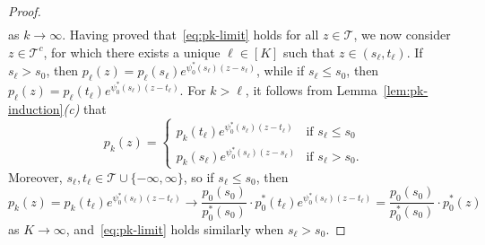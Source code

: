 \documentclass[a4paper]{article}
\theoremstyle{definition}
\begin{document}
\begin{proof}
\begin{align*}
\end{align*}
as $k \to \infty$. Having proved that~\eqref{eq:pk-limit} holds for all $z \in \mathcal{T}$, we now consider $z \in \mathcal{T}^c$, for which there exists a unique $\ell \in [K]$ such that $z \in (s_\ell,t_\ell)$. If $s_\ell > s_0$, then $p_\ell(z) = p_\ell(s_\ell)e^{\psi_0^*(s_\ell)(z - s_\ell)}$, while if $s_\ell \leq s_0$, then $p_\ell(z) = p_\ell(t_\ell)e^{\psi_0^*(s_\ell)(z - t_\ell)}$.
For $k > \ell$, it follows from Lemma~\ref{lem:pk-induction}\textit{(c)} that
\[
p_k(z) = 
\begin{cases}
p_k(t_\ell)e^{\psi_0^*(s_\ell)(z - t_\ell)} &\text{if }s_\ell \leq s_0 \\
p_k(s_\ell)e^{\psi_0^*(s_\ell)(z - s_\ell)} &\text{if }s_\ell > s_0.
\end{cases}
\]
Moreover, $s_\ell,t_\ell \in \mathcal{T} \cup \{-\infty,\infty\}$, so if $s_\ell \leq s_0$, then
\[
p_k(z) = p_k(t_\ell)e^{\psi_0^*(s_\ell)(z - t_\ell)} \to \frac{p_0(s_0)}{p_0^*(s_0)} \cdot p_0^*(t_\ell)e^{\psi_0^*(s_\ell)(z - t_\ell)} = \frac{p_0(s_0)}{p_0^*(s_0)} \cdot p_0^*(z)
\]
as $K \to \infty$, and~\eqref{eq:pk-limit} holds similarly when $s_\ell > s_0$.


\end{proof}
\end{document}

